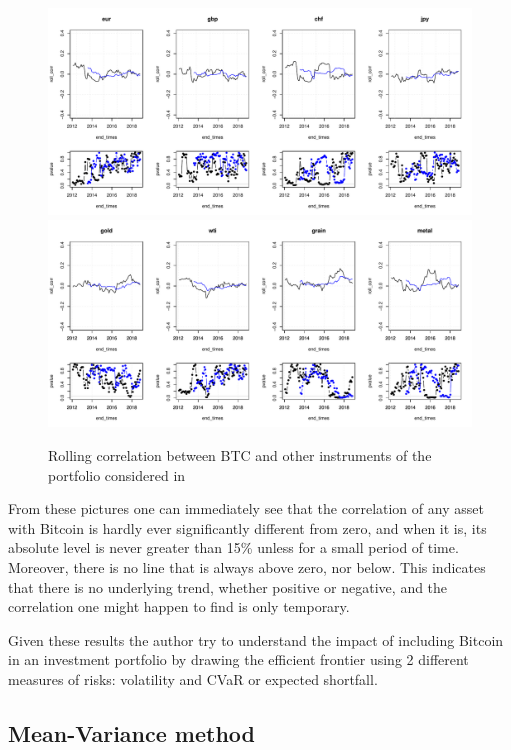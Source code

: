 \begin{figure}[htpb]
		\centering
		\includegraphics[width=14.5cm]{Images/images_samuele/rolling_fx.pdf} %
		\bigskip
		\includegraphics[width=14.5cm]{Images/images_samuele/rolling_commodities.pdf} %
		\caption{Rolling correlation between BTC and other instruments of the portfolio considered in \citep{samuele}}
		\label{samuele2}
\end{figure}

From these pictures one can immediately see that the correlation of any asset with Bitcoin is hardly ever significantly different from zero, and when it is, its absolute level is never greater than 15\% unless for a small period of time. Moreover, there is no line that is always above zero, nor below. This indicates that there is no underlying trend, whether positive or negative, and the correlation one might happen to find is only temporary.

Given these results the author try to understand the impact of including Bitcoin in an investment portfolio by drawing the efficient frontier using 2 different measures of risks: volatility and CVaR or expected shortfall.


\subsection{Mean-Variance method}


